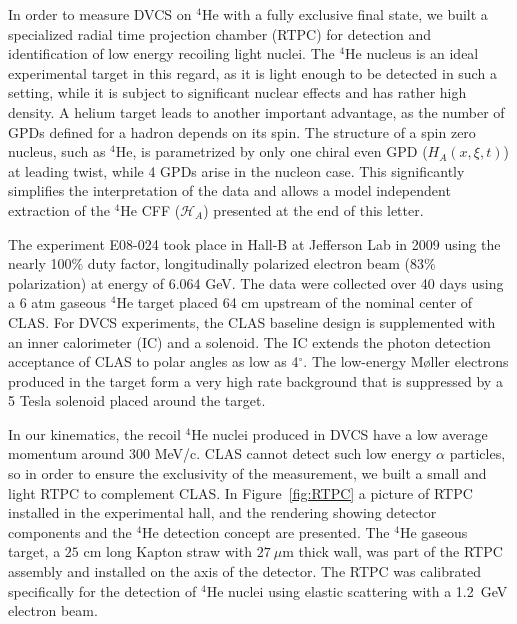 \documentclass[twocolumn,nofootinbib,showpacs,prl,superscriptaddress,secnumarabic,amssymb,nobibnotes,aps,floatfix]{revtex4}
\begin{document}
In order to measure DVCS on $^4$He with a fully exclusive final state, we 
built a specialized radial time projection chamber (RTPC) for detection and identification of
low energy recoiling light nuclei. The $^4$He nucleus is an ideal experimental target in this regard, as 
it is light enough to be detected in such a setting, while it
is subject to significant nuclear effects \cite{JSeely} and has rather high 
density.  A helium target leads to another important advantage, as the number of GPDs 
defined for a hadron depends on its spin. The structure of a spin zero nucleus, such as 
$^4$He, is parametrized by only one chiral even GPD ($H_{A}(x,\xi,t)$) at 
leading twist, while 4 GPDs arise in the nucleon case. This significantly
simplifies the interpretation of the data and allows a model independent
extraction of the $^4$He CFF ($\mathcal{H}_{A}$) presented at the
end of this letter. 


The experiment E08-024 took place in Hall-B at Jefferson Lab in 2009 using the 
nearly 100\% duty factor, longitudinally polarized electron beam (83$\%$ 
polarization) at energy of 6.064 GeV. The data were collected over 40 days 
using a 6 atm gaseous $^4$He target placed 64 cm upstream of the nominal center of CLAS. For DVCS 
experiments, the CLAS baseline design \cite{Mecking:2003zu} is supplemented 
with an inner calorimeter (IC) and a solenoid. The IC extends the photon 
detection acceptance of CLAS to polar angles as low as 4$^{\circ}$. The 
low-energy M\o{}ller electrons produced in the target form a very high rate 
background that is suppressed by a 5 Tesla solenoid placed around the target. 

In our kinematics, the recoil $^4$He nuclei produced in DVCS have a low average 
momentum around 300 MeV/c. CLAS cannot detect such low energy $\alpha$ 
particles, so in order to ensure the exclusivity of the measurement, we built a 
small and light RTPC to complement CLAS. In Figure~\ref{fig:RTPC} a picture of 
RTPC installed in the experimental hall, and the rendering showing detector 
components and the $^4$He detection concept are presented. The $^4$He gaseous 
target, a $25$ cm long Kapton straw with $27~\mu$m thick wall, was part of the RTPC
assembly and installed on the axis of the detector. The RTPC was calibrated specifically for the detection 
of $^4$He nuclei using elastic scattering with a 1.2~GeV electron beam.
\end{document}
